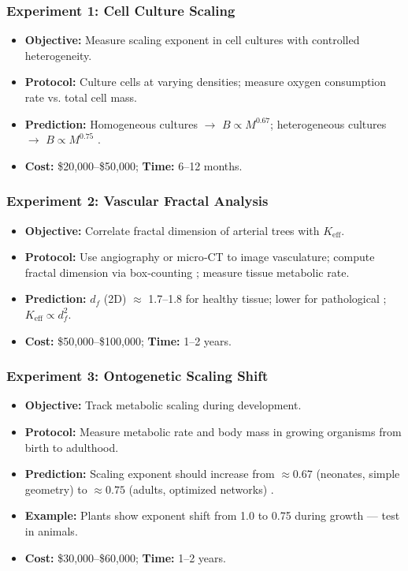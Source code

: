 \documentclass[12pt]{article}
\newcommand{\Keff}{K_{\mathrm{eff}}}
\begin{document}
	\subsubsection{Experiment 1: Cell Culture Scaling}
	\begin{itemize}
		\item \textbf{Objective:} Measure scaling exponent in cell cultures with controlled heterogeneity.
		\item \textbf{Protocol:} Culture cells at varying densities; measure oxygen consumption rate vs. total cell mass.
		\item \textbf{Prediction:} Homogeneous cultures \(\rightarrow\) \(B \propto M^{0.67}\); heterogeneous cultures \(\rightarrow\) \(B \propto M^{0.75}\) \cite{Takemoto2015}.
		\item \textbf{Cost:} \$20,000–\$50,000; \textbf{Time:} 6–12 months.
	\end{itemize}
	
	\subsubsection{Experiment 2: Vascular Fractal Analysis}
	\begin{itemize}
		\item \textbf{Objective:} Correlate fractal dimension of arterial trees with \(\Keff\).
		\item \textbf{Protocol:} Use angiography or micro‑CT to image vasculature; compute fractal dimension via box‑counting \cite{Cross1993}; measure tissue metabolic rate.
		\item \textbf{Prediction:} \(d_f\) (2D) \(\approx\) 1.7–1.8 for healthy tissue; lower for pathological \cite{Gould1993}; \(\Keff \propto d_f^2\).
		\item \textbf{Cost:} \$50,000–\$100,000; \textbf{Time:} 1–2 years.
	\end{itemize}
	
	\subsubsection{Experiment 3: Ontogenetic Scaling Shift}
	\begin{itemize}
		\item \textbf{Objective:} Track metabolic scaling during development.
		\item \textbf{Protocol:} Measure metabolic rate and body mass in growing organisms from birth to adulthood.
		\item \textbf{Prediction:} Scaling exponent should increase from \(\approx 0.67\) (neonates, simple geometry) to \(\approx 0.75\) (adults, optimized networks) \cite{Glazier2005}.
		\item \textbf{Example:} Plants show exponent shift from 1.0 to 0.75 during growth \cite{Reich2006} — test in animals.
		\item \textbf{Cost:} \$30,000–\$60,000; \textbf{Time:} 1–2 years.
	\end{itemize}
	
\end{document}
